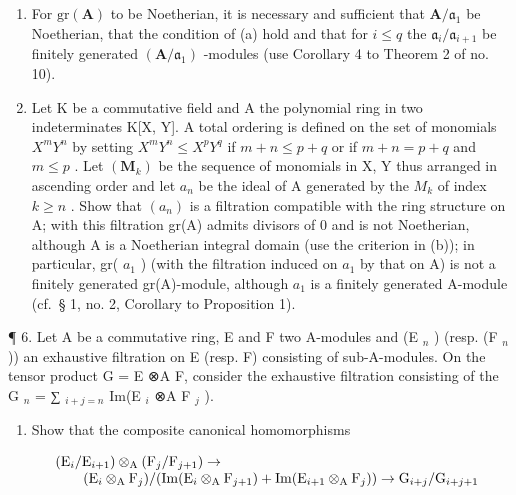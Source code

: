 \begin{enumerate}
\def\labelenumi{(\alph{enumi})}
\setcounter{enumi}{1}
\item
  For \(\mathrm{gr}(\mathbf{A})\) to be Noetherian, it is necessary and sufficient that \(\mathbf{A} / \mathfrak{a}_1\) be Noetherian, that the condition of (a) hold and that for \(i \leqslant q\) the \(\mathfrak{a}_i / \mathfrak{a}_{i+1}\) be finitely generated \((\mathbf{A} / \mathfrak{a}_1)\) -modules (use Corollary 4 to Theorem 2 of no. 10).
\item
  Let K be a commutative field and A the polynomial ring in two indeterminates K{[}X, Y{]}. A total ordering is defined on the set of monomials \(X^{m}Y^{n}\) by setting \(X^{m}Y^{n} \leqslant X^{p}Y^{q}\) if \(m + n \leqslant p + q\) or if \(m + n = p + q\) and \(m \leqslant p\) . Let \((\mathbf{M}_{k})\) be the sequence of monomials in X, Y thus arranged in ascending order and let \(a_{n}\) be the ideal of A generated by the \(M_{k}\) of index \(k \geqslant n\) . Show that \((a_{n})\) is a filtration compatible with the ring structure on A; with this filtration gr(A) admits divisors of 0 and is not Noetherian, although A is a Noetherian integral domain (use the criterion in (b)); in particular, gr( \(a_{1}\) ) (with the filtration induced on \(a_{1}\) by that on A) is not a finitely generated gr(A)-module, although \(a_{1}\) is a finitely generated A-module (cf.~§ 1, no. 2, Corollary to Proposition 1).
\end{enumerate}

¶ 6. Let A be a commutative ring, E and F two A-modules and (E \(_{n}\) ) (resp. (F \(_{n}\) )) an exhaustive filtration on E (resp. F) consisting of sub-A-modules. On the tensor product G = E ⊗A F, consider the exhaustive filtration consisting of the G \(_{n}\) = ∑ \(_{i+j=n}\) Im(E \(_{i}\) ⊗A F \(_{j}\) ).

\begin{enumerate}
\def\labelenumi{(\alph{enumi})}
\tightlist
\item
  Show that the composite canonical homomorphisms
\end{enumerate}

\[
\begin{array}{r l}&(\mathrm{E} _ {i} / \mathrm{E} _ {i + 1}) \otimes_ {\mathrm{A}} (\mathrm{F} _ {j} / \mathrm{F} _ {j + 1}) \rightarrow\\&\qquad (\mathrm{E} _ {i} \otimes_ {\mathrm{A}} \mathrm{F} _ {j}) / (\operatorname{Im} (\mathrm{E} _ {i} \otimes_ {\mathrm{A}} \mathrm{F} _ {j + 1}) + \operatorname{Im} (\mathrm{E} _ {i + 1} \otimes_ {\mathrm{A}} \mathrm{F} _ {j})) \rightarrow \mathrm{G} _ {i + j} / \mathrm{G} _ {i + j + 1}\end{array}
\]

